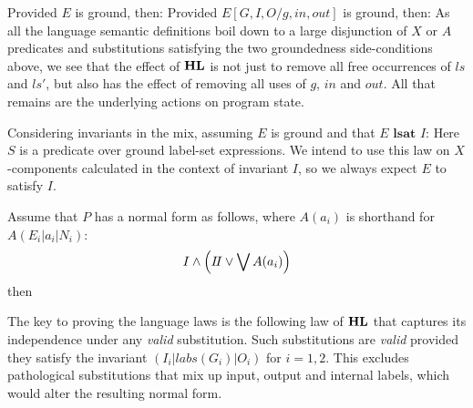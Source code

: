 Provided $E$ is ground, then:
Provided $E[G,I,O/g,in,out]$ is ground, then:
As all the language semantic definitions boil down to a large
disjunction of $X$ or $A$ predicates and substitutions satisfying
the two groundedness side-conditions above,
we see that the effect of $\mathbf{HL}$ is not just to remove
all free occurrences of $ls$ and $ls'$,
but also has the effect of removing all uses of $g$, $in$ and $out$.
All that remains are the underlying actions on program state.

Considering invariants in the mix, assuming $E$ is ground
and that $E \textbf{ lsat } I$:
Here $S$ is a predicate over ground label-set expressions.
We intend to use this law on $X$-components calculated in the
context of invariant $I$, so we always expect $E$ to satisfy $I$.

Assume that $P$ has a normal form as follows,
where $A(a_i)$ is shorthand for $A(E_i|a_i|N_i)$:
\[
   I \land \left( I\!I \lor \bigvee A(a_i) \right)
\]
then


The key to proving the language laws is the following law of $\mathbf{HL}$
that captures its independence under any \emph{valid} substitution.
Such substitutions are \emph{valid} provided they satisfy the invariant
$(I_i | labs(G_i) | O_i)$ for $i=1,2$.
This excludes pathological substitutions that mix up input, output
and internal labels, which would alter the resulting normal form.

